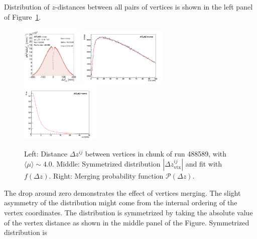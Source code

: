 Distribution of $z$-distances between all pairs of vertices is shown in the left panel of Figure~\ref{fig:vtx_z_dist}. 
\begin{figure}[h]
\centering
\includegraphics[width=0.26\textwidth]{images/vertex_z_dist_488589.png}
\includegraphics[width=0.38\textwidth]{images/fit_bw_z.png}
\includegraphics[width=0.34\textwidth]{images/fit_merg_prob.png}
\caption{Left: Distance $\Delta z^{ij}$ between vertices in chunk of run 488589, with $\langle \mu \rangle \sim 4.0$. Middle: Symmetrized distribution $|\Delta z_\text{vtx}^{ij}|$ and fit with $f(\Delta z)$. Right: Merging probability function $\mathcal{P}(\Delta z)$. 
    \label{fig:vtx_z_dist}}
\end{figure}
The drop around zero demonstrates the effect of vertices merging. The slight asymmetry of the distribution might come from the internal ordering of the vertex coordinates. The distribution is symmetrized by taking the absolute value of the vertex distance as shown in the middle panel of the Figure. Symmetrized distribution is 
